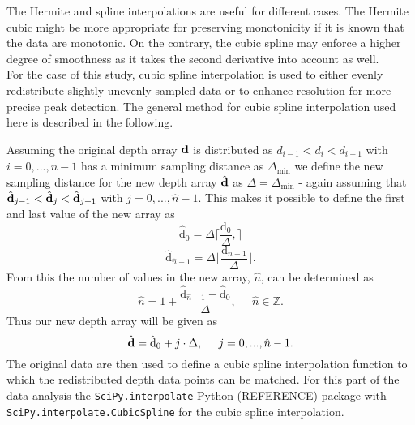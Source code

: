 \documentclass[../../CompleteThesis2/Complete_2ndDraft.tex]{subfiles}
\begin{document}
	The Hermite and spline interpolations are useful for different cases. The Hermite cubic might be more appropriate for preserving monotonicity if it is known that the data are monotonic. On the contrary, the cubic spline may enforce a higher degree of smoothness as it takes the second derivative into account as well.\\
	For the case of this study, cubic spline interpolation is used to either evenly redistribute slightly unevenly sampled data or to enhance resolution for more precise peak detection. The general method for cubic spline interpolation used here is described in the following.
	
	Assuming the original depth array $\text{\textbf{d}}$ is distributed as $d_{i-1} < d_i < d_{i+1}$ with $i = 0, ..., n-1$ has a minimum sampling distance as $\Delta_{\text{min}}$ we define the new sampling distance for the new depth array $\hat{\text{\textbf{d}}}$ as $\Delta =\Delta_{\text{min}}$ - again assuming that $\hat{\text{\textbf{d}}}_{j-1} < \hat{\text{\textbf{d}}}_j < \hat{\text{\textbf{d}}}_{j+1}$ with $j = 0, ..., \hat{n}-1$. This makes it possible to define the first and last value of the new array as
	\begin{equation}
		\hat{\text{d}}_0 = \Delta \lceil \frac{\text{d}_0}{\Delta}, \rceil 
		\label{Eq:InterpDepthMin}
	\end{equation}
	\begin{equation}
		\hat{\text{d}}_{\hat{n}-1} = \Delta \lfloor \frac{\text{d}_{n-1}}{\Delta} \rfloor.
		\label{Eq:InterpDepthMax}
	\end{equation}
	From this the number of values in the new array, $\hat{n}$, can be determined as
	\begin{equation}
		\hat{n} = 1 +  \frac{\hat{\text{d}}_{\hat{n}-1} - \hat{\text{d}}_0}{\Delta},\;\;\;\;\; \hat{n} \in\mathbb{Z}.
	\end{equation}
	Thus our new depth array will be given as
	\begin{equation}
		\hat{\text{\textbf{d}}} = \hat{\text{d}}_0 + j\cdot\Delta,\;\;\;\;\; j = 0, ..., \hat{n}-1.
	\end{equation}
	The original data are then used to define a cubic spline interpolation function to which the redistributed depth data points can be matched. For this part of the data analysis the \lstinline[columns=fixed]|SciPy.interpolate| Python (REFERENCE) package with \lstinline[columns=fixed]|SciPy.interpolate.CubicSpline| for the cubic spline interpolation.
	
	
		
\end{document}
